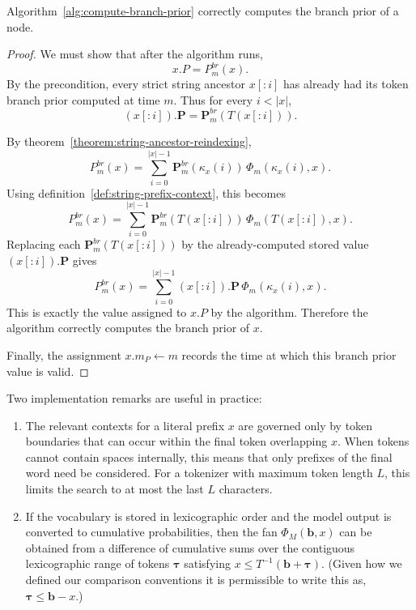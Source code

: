 \begin{theorem}
    Algorithm~\ref{alg:compute-branch-prior} correctly computes the branch prior of a node.
\end{theorem}
\begin{proof}
    We must show that after the algorithm runs,
    \[
    x.P = P^{br}_m(x).
    \]
    By the precondition, every strict string ancestor $x[:i]$ has already had its
    token branch prior computed at time $m$. Thus for every $i < |x|$,
    \[
    (x[:i]).\mathbf{P}=\mathbf{P}^{br}_m(T(x[:i])).
    \]

    By theorem~\ref{theorem:string-ancestor-reindexing},
    \[
    P^{br}_m(x)
    =
    \sum_{i=0}^{|x|-1}
    \mathbf{P}^{br}_m(\kappa_x(i)) \, \Phi_m(\kappa_x(i),x).
    \]
    Using definition~\ref{def:string-prefix-context}, this becomes
    \[
    P^{br}_m(x)
    =
    \sum_{i=0}^{|x|-1}
    \mathbf{P}^{br}_m(T(x[:i])) \, \Phi_m(T(x[:i]),x).
    \]
    Replacing each $\mathbf{P}^{br}_m(T(x[:i]))$ by the already-computed stored
    value $(x[:i]).\mathbf{P}$ gives
    \[
    P^{br}_m(x)
    =
    \sum_{i=0}^{|x|-1}
    (x[:i]).\mathbf{P}\,\Phi_m(\kappa_x(i),x).
    \]
    This is exactly the value assigned to $x.P$ by the algorithm.
    Therefore the algorithm correctly computes the branch prior of $x$.

    Finally, the assignment $x.m_P\gets m$ records the time at which this branch
    prior value is valid.
\end{proof}


Two implementation remarks are useful in practice:
\begin{enumerate}
    \item The relevant contexts for a literal prefix $x$ are governed only by token
    boundaries that can occur within the final token overlapping $x$.
    When tokens cannot contain spaces internally, this means that only prefixes of the
    final word need be considered.
    For a tokenizer with maximum token length $L$, this limits the search to at most the
    last $L$ characters.
    \item If the vocabulary is stored in lexicographic order and the model output is
    converted to cumulative probabilities, then the fan
    $\Phi_M(\mathbf{b},x)$ can be obtained from a difference of cumulative sums over the
    contiguous lexicographic range of tokens $\boldsymbol{\tau}$ satisfying
    $x\le T^{-1}(\mathbf{b}+\boldsymbol{\tau})$. (Given how we defined our comparison conventions it is permissible to write this as, $\boldsymbol{\tau} \leq \mathbf{b} - x$.)
\end{enumerate}

